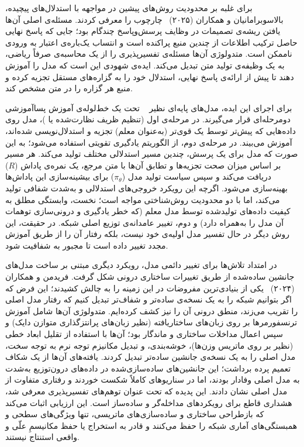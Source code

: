 برای غلبه بر محدودیت روش‌های پیشین در مواجهه با استدلال‌های پیچیده، بالاسوبرامانیان و همکاران (۲۰۲۵)~\cite{balasubramanian2025decomposition} چارچوب  را معرفی کردند. مسئله‌ی اصلی آن‌ها یافتن ریشه‌ی تصمیمات در وظایف پرسش‌وپاسخ چندگام بود؛ جایی که پاسخ نهایی حاصل ترکیب اطلاعات از چندین منبع پراکنده است و انتساب یک‌باره‌ی اعتبار به ورودی ناممکن است. متدولوژی آن‌ها مسئله‌ی تفسیرپذیری را از یک محاسبه‌ی صرفاً ریاضی، به یک وظیفه‌ی تولید متن تبدیل می‌کند. ایده‌ی شهودی این است که مدل را آموزش دهند تا پیش از ارائه‌ی پاسخ نهایی، استدلال خود را به گزاره‌های مستقل تجزیه کرده و منبع هر گزاره را در متن مشخص کند.

برای اجرای این ایده، مدل‌های پایه‌ای نظیر ~\cite{qwen2024qwen25} تحت یک خط‌لوله‌ی آموزش پساآموزشی دومرحله‌ای قرار می‌گیرند. در مرحله‌ی اول (تنظیم ظریف نظارت‌شده یا )، مدل روی داده‌هایی که پیش‌تر توسط یک  قوی‌تر (به‌عنوان معلم) تجزیه و استدلال‌نویسی شده‌اند، آموزش می‌بیند. در مرحله‌ی دوم، از الگوریتم یادگیری تقویتی  استفاده می‌شود؛ به این صورت که مدل برای یک پرسش، چندین مسیر استدلالی مختلف تولید می‌کند. هر مسیر بر اساس میزان صحت تجزیه‌ها و تطابق آن‌ها با متن مرجع، یک نمره‌ی پاداش ($R$) دریافت می‌کند و سپس سیاست تولید مدل ($\pi_\theta$) برای بیشینه‌سازی این پاداش‌ها بهینه‌سازی می‌شود. اگرچه این رویکرد خروجی‌های استدلالی و به‌شدت شفافی تولید می‌کند، اما با دو محدودیت روش‌شناختی مواجه است؛ نخست، وابستگی مطلق به کیفیت داده‌های تولیدشده توسط مدل معلم (که خطر یادگیری و درونی‌سازی توهمات آن مدل را به‌همراه دارد) و دوم، تغییر عامدانه‌ی توزیع اصلی شبکه. در حقیقت، این روش دیگر در حال تفسیر مدل اولیه‌ی خود نیست، بلکه رفتار آن را از طریق آموزش مجدد تغییر داده است تا مجبور به شفافیت شود.

در امتداد تلاش‌ها برای تغییر دائمی مدل، رویکرد دیگری مبتنی بر ساخت مدل‌های جانشین ساده‌شده از طریق تغییرات ساختاری درونی شکل گرفت. فریدمن و همکاران (۲۰۲۴)~\cite{friedman2024interpretability} یکی از بنیادی‌ترین مفروضات در این زمینه را به چالش کشیدند؛ این فرض که اگر بتوانیم شبکه را به یک نسخه‌ی ساده‌تر و شفاف‌تر تبدیل کنیم که رفتار مدل اصلی را تقریب می‌زند، منطق درونی آن را نیز کشف کرده‌ایم. متدولوژی آن‌ها شامل آموزش ترنسفورمرها بر روی زبان‌های ساختاریافته (نظیر زبان‌های پرانتزگذاری متوازن دایک) و سپس اعمال مداخلات ساختاری و ماندگار بود؛ آن‌ها با استفاده از تقلیل ابعاد خطی (نظیر  بر روی ماتریس وزن‌ها)، خوشه‌بندی، و تبدیل مکانیزم توجه نرم به توجه سخت، مدل اصلی را به یک نسخه‌ی جانشین ساده‌تر تبدیل کردند. یافته‌های آن‌ها از یک شکاف تعمیم پرده برداشت؛ این جانشین‌های ساده‌سازی‌شده در داده‌های درون‌توزیع به‌شدت به مدل اصلی وفادار بودند، اما در سناریوهای  کاملاً شکست خوردند و رفتاری متفاوت از مدل اصلی نشان دادند. این پدیده که تحت عنوان توهم‌های تفسیرپذیری معرفی شد، هشداری قاطع برای رویکردهای مداخله‌گر و ساده‌ساز است. این ارزیابی اثبات می‌کند که بازطراحی ساختاری و ساده‌سازی‌های ماتریسی، تنها ویژگی‌های سطحی و همبستگی‌های آماری شبکه را حفظ می‌کنند و قادر به استخراج یا حفظ مکانیسمِ علّی و واقعی استنتاج نیستند.


